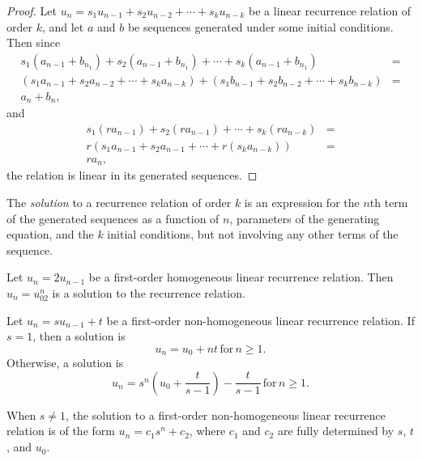 \documentclass[12pt]{article}
\begin{document}
\begin{proof}
    Let $u_n = s_1u_{n-1} + s_2u_{n-2} + \cdots + s_ku_{n-k}$ be a linear recurrence relation of order $k$, and let $a$ and $b$ be sequences generated under some initial conditions. Then since
    \begin{align*}
        s_1(a_{n-1} + b_{n_1}) + s_2(a_{n-1} + b_{n_1}) + \cdots + s_k(a_{n-1} + b_{n_1}) & = \\ (s_1a_{n-1} + s_2a_{n-2} + \cdots + s_ka_{n-k}) + (s_1b_{n-1} + s_2b_{n-2} + \cdots + s_kb_{n-k}) & = \\
        a_n + b_n, &
    \end{align*}
    and
    \begin{align*}
        s_1(ra_{n-1}) + s_2(ra_{n-1}) + \cdots + s_k(ra_{n-k}) & = \\
        r(s_1a_{n-1} + s_2a_{n-1} + \cdots + r(s_ka_{n-k})) & = \\
        ra_n, &
    \end{align*}
    the relation is linear in its generated sequences.
\end{proof}

\begin{defn}
    The \emph{solution} to a recurrence relation of order $k$ is an expression for the $n$th term of the generated sequences as a function of $n$, parameters of the generating equation, and the $k$ initial conditions, but not involving any other terms of the sequence.
\end{defn}

\begin{exmp}
    Let $u_n = 2u_{n-1}$ be a first-order homogeneous linear recurrence relation. Then $u_n = u_02^n$ is a solution to the recurrence relation.
\end{exmp}

\begin{thm}
    Let $u_n = su_{n-1} + t$ be a first-order non-homogeneous linear recurrence relation. If $s = 1$, then a solution is \[u_n = u_0 + nt \,\textrm{for}\, n \geq 1.\] Otherwise, a solution is \[u_n = s^n(u_0 + \frac{t}{s-1}) - \frac{t}{s-1} \,\textrm{for}\, n \geq 1.\]
\end{thm}

\begin{rmk}
    When $s \neq 1$, the solution to a first-order non-homogeneous linear recurrence relation is of the form $u_n = c_1s^n + c_2$, where $c_1$ and $c_2$ are fully determined by $s$, $t$, and $u_0$.
\end{rmk}
\end{document}

